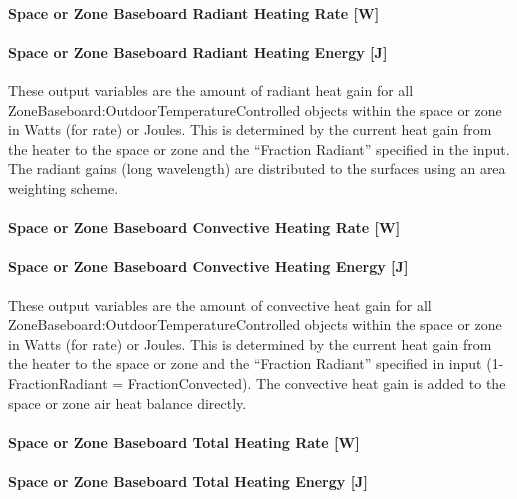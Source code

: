 \paragraph{Space or Zone Baseboard Radiant Heating Rate {[}W{]}}\label{zone-baseboard-radiant-heating-rate-w}

\paragraph{Space or Zone Baseboard Radiant Heating Energy {[}J{]}}\label{zone-baseboard-radiant-heating-energy-j}

These output variables are the amount of radiant heat gain for all Zone\-Baseboard:\-Outdoor\-Temperature\-Controlled objects within the space or zone in Watts (for rate) or Joules. This is determined by the current heat gain from the heater to the space or zone and the ``Fraction Radiant'' specified in the input. The radiant gains (long wavelength) are distributed to the surfaces using an area weighting scheme.

\paragraph{Space or Zone Baseboard Convective Heating Rate {[}W{]}}\label{zone-baseboard-convective-heating-rate-w}

\paragraph{Space or Zone Baseboard Convective Heating Energy {[}J{]}}\label{zone-baseboard-convective-heating-energy-j}

These output variables are the amount of convective heat gain for all Zone\-Baseboard:\-Outdoor\-Temperature\-Controlled objects within the space or zone in Watts (for rate) or Joules. This is determined by the current heat gain from the heater to the space or zone and the ``Fraction Radiant'' specified in input (1-FractionRadiant = FractionConvected). The convective heat gain is added to the space or zone air heat balance directly.

\paragraph{Space or Zone Baseboard Total Heating Rate {[}W{]}}\label{zone-baseboard-total-heating-rate-w}

\paragraph{Space or Zone Baseboard Total Heating Energy {[}J{]}}\label{zone-baseboard-total-heating-energy-j}

